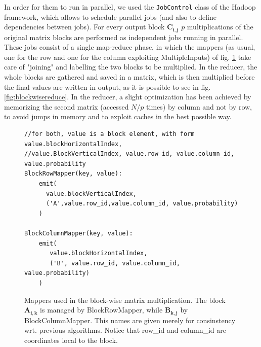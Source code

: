 In order for them to run in parallel, we used the \texttt{JobControl} class of the Hadoop framework, which allows to
schedule parallel jobs (and also to define dependencies between jobs). For every output block $\mathbf{C_{i,j}}$ $p$ 
multiplications of the original matrix blocks are performed as independent jobs running in parallel. 
These jobs consist of a single map-reduce phase, in which the mappers (as usual, one for the row and one for the column exploiting MultipleInputs) of fig. \ref{fig:blockwisemap} take care of "joining" and labelling the two blocks to be multiplied.
In the reducer, the whole blocks are gathered and saved in a matrix, which is then multiplied before the final values
are written in output, as it is possible to see in fig. \ref{fig:blockwisereduce}.
In the reducer, a slight optimization has been achieved by memorizing the second matrix (accessed $N/p$ times) by column
and not by row, to avoid jumps in memory and to exploit caches in the best possible way.

\begin{figure}[H]
\begin{verbatim}
//for both, value is a block element, with form value.blockHorizontalIndex,
//value.BlockVerticalIndex, value.row_id, value.column_id, value.probability
BlockRowMapper(key, value):
    emit(
      value.blockVerticalIndex, 
      ('A',value.row_id,value.column_id, value.probability)
    )

BlockColumnMapper(key, value):
    emit(
       value.blockHorizontalIndex,
       ('B', value.row_id, value.column_id, value.probability)
    )
\end{verbatim}
\caption{Mappers used in the block-wise matrix multiplication. The block $\mathbf{A_{i,k}}$ is managed by BlockRowMapper, while $\mathbf{B_{k,j}}$ by BlockColumnMapper. This names are given merely for consinstency wrt. previous algorithms. Notice that row\_id and column\_id are coordinates local to the block.} 
\label{fig:blockwisemap}
\end{figure}

